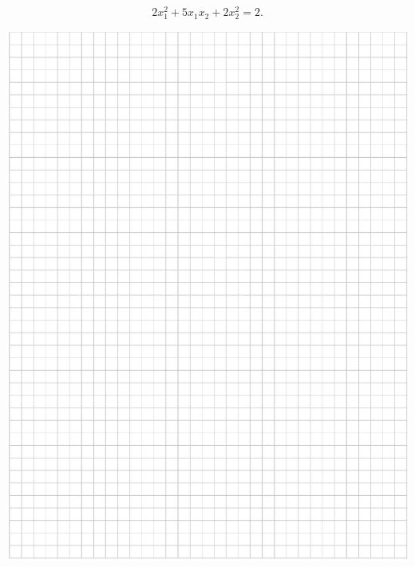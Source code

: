 \documentclass[10pt]{article}
\begin{document}
\[
2 x_{1}^{2}+5 x_{1} x_{2}+2 x_{2}^{2}=2 .
\]

\includegraphics[max width=\textwidth, center]{2024_11_21_ebf83f11df6f4915f701g-10}\\
\end{document}

